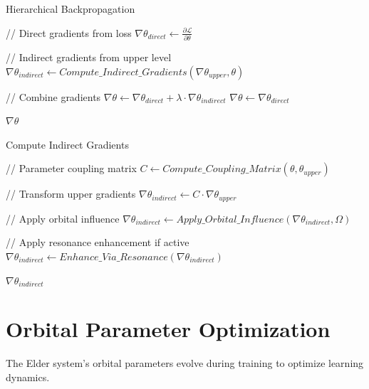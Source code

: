 \begin{algorithm}
\caption{Hierarchical Backpropagation}
\begin{algorithmic}[1]
    \State // Direct gradients from loss
    \State $\nabla \theta_{direct} \gets \frac{\partial \mathcal{L}}{\partial \theta}$
    
        \State // Indirect gradients from upper level
        \State $\nabla \theta_{indirect} \gets Compute\_Indirect\_Gradients(\nabla \theta_{upper}, \theta)$
        
        \State // Combine gradients
        \State $\nabla \theta \gets \nabla \theta_{direct} + \lambda \cdot \nabla \theta_{indirect}$
    \Else
        \State $\nabla \theta \gets \nabla \theta_{direct}$
    \EndIf
    
    \State \Return $\nabla \theta$
\EndFunction
\end{algorithmic}
\end{algorithm}

\begin{algorithm}
\caption{Compute Indirect Gradients}
\begin{algorithmic}[1]
    \State // Parameter coupling matrix
    \State $C \gets Compute\_Coupling\_Matrix(\theta, \theta_{upper})$
    
    \State // Transform upper gradients
    \State $\nabla \theta_{indirect} \gets C \cdot \nabla \theta_{upper}$
    
    \State // Apply orbital influence
    \State $\nabla \theta_{indirect} \gets Apply\_Orbital\_Influence(\nabla \theta_{indirect}, \Omega)$
    
    \State // Apply resonance enhancement if active
        \State $\nabla \theta_{indirect} \gets Enhance\_Via\_Resonance(\nabla \theta_{indirect})$
    \EndIf
    
    \State \Return $\nabla \theta_{indirect}$
\EndFunction
\end{algorithmic}
\end{algorithm}

\section{Orbital Parameter Optimization}

The Elder system's orbital parameters evolve during training to optimize learning dynamics.

